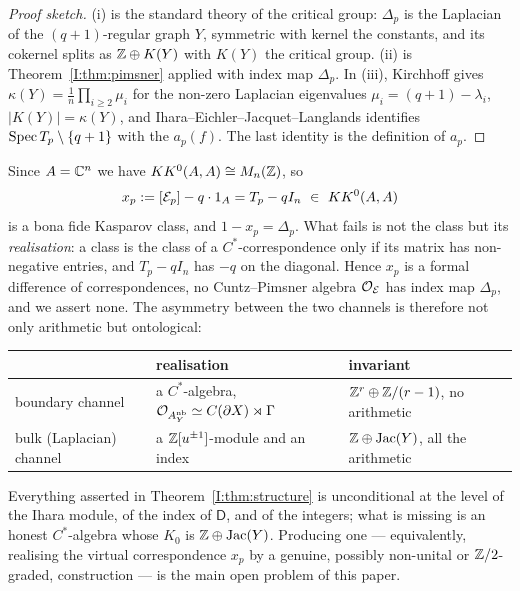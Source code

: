 \begin{proof}[Proof sketch]
(i) is the standard theory of the critical group: $\Delta_p$ is the Laplacian of the
$(q+1)$-regular graph $Y$, symmetric with kernel the constants, and its cokernel splits
as $\mathbb{Z}\oplus K(Y)$ with $K(Y)$ the critical group. (ii) is
Theorem~\ref{I:thm:pimsner} applied with index map $\Delta_p$. In (iii), Kirchhoff gives
$\kappa(Y)=\frac1n\prod_{i\ge2}\mu_i$ for the non-zero Laplacian eigenvalues
$\mu_i=(q+1)-\lambda_i$, $|K(Y)|=\kappa(Y)$, and Ihara--Eichler--Jacquet--Langlands
identifies $\operatorname{Spec} T_p\setminus\{q+1\}$ with the $a_p(f)$. The last identity is the
definition of $a_p$.
\end{proof}

\begin{remark}\label{I:rem:noalgebra}
Since $A=\mathbb{C}^n$ we have $KK^0(A,A)\cong M_n(\mathbb{Z})$, so
\[
x_p:=[\cE_p]-q\cdot 1_A=T_p-qI_n\ \in\ KK^0(A,A)
\]
is a bona fide Kasparov class, and $1-x_p=\Delta_p$. What fails is not the class but its
\emph{realisation}: a class is the class of a $C^*$-correspondence only if its matrix has
non-negative entries, and $T_p-qI_n$ has $-q$ on the diagonal. Hence $x_p$ is a formal
difference of correspondences, no Cuntz--Pimsner algebra $\mathcal{O}_{\mathcal{E}}$ has index map
$\Delta_p$, and we assert none. The asymmetry between the two channels is therefore not
only arithmetic but ontological:
\begin{center}\small
\begin{tabular}{lll}
\toprule
& realisation & invariant\\
\midrule
boundary channel & a $C^*$-algebra, $\mathcal{O}_{A^{\mathrm{nb}}_Y}\simeq C(\partial X)\rtimes\Gamma$
& $\mathbb{Z}^r\oplus\mathbb{Z}/(r-1)$, no arithmetic\\
bulk (Laplacian) channel & a $\mathbb{Z}[u^{\pm1}]$-module and an index & $\mathbb{Z}\oplus\operatorname{Jac}(Y)$, all the arithmetic\\
\bottomrule
\end{tabular}
\end{center}
Everything asserted in Theorem~\ref{I:thm:structure} is unconditional at the level of the
Ihara module, of the index of $\mathsf{D}$, and of the integers; what is missing is an
honest $C^*$-algebra whose $K_0$ is $\mathbb{Z}\oplus\operatorname{Jac}(Y)$. Producing one --- equivalently,
realising the virtual correspondence $x_p$ by a genuine, possibly non-unital or
$\mathbb{Z}/2$-graded, construction --- is the main open problem of this paper.


\end{remark}

